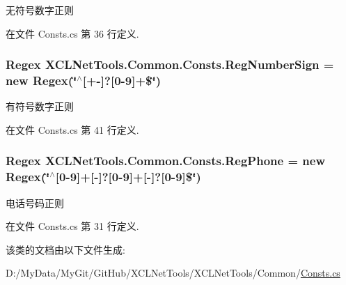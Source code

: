无符号数字正则 



在文件 Consts.\-cs 第 36 行定义.

\hypertarget{class_x_c_l_net_tools_1_1_common_1_1_consts_aaa6eaa871d664473d2e6d189c825f177}{
\subsubsection[{Reg\-Number\-Sign}]{\setlength{\rightskip}{0pt plus 5cm}Regex X\-C\-L\-Net\-Tools.\-Common.\-Consts.\-Reg\-Number\-Sign = new Regex(\char`\"{}$^\wedge$\mbox{[}+-\/\mbox{]}?\mbox{[}0-\/9\mbox{]}+\$\char`\"{})\hspace{0.3cm}{\ttfamily [static]}}}\label{class_x_c_l_net_tools_1_1_common_1_1_consts_aaa6eaa871d664473d2e6d189c825f177}


有符号数字正则 



在文件 Consts.\-cs 第 41 行定义.

\hypertarget{class_x_c_l_net_tools_1_1_common_1_1_consts_a88185aad823255cb7bf15a88d8ef55de}{
\subsubsection[{Reg\-Phone}]{\setlength{\rightskip}{0pt plus 5cm}Regex X\-C\-L\-Net\-Tools.\-Common.\-Consts.\-Reg\-Phone = new Regex(\char`\"{}$^\wedge$\mbox{[}0-\/9\mbox{]}+\mbox{[}-\/\mbox{]}?\mbox{[}0-\/9\mbox{]}+\mbox{[}-\/\mbox{]}?\mbox{[}0-\/9\mbox{]}\$\char`\"{})\hspace{0.3cm}{\ttfamily [static]}}}\label{class_x_c_l_net_tools_1_1_common_1_1_consts_a88185aad823255cb7bf15a88d8ef55de}


电话号码正则 



在文件 Consts.\-cs 第 31 行定义.



该类的文档由以下文件生成\-:\begin{DoxyCompactItemize}
\item 
D\-:/\-My\-Data/\-My\-Git/\-Git\-Hub/\-X\-C\-L\-Net\-Tools/\-X\-C\-L\-Net\-Tools/\-Common/\hyperlink{_consts_8cs}{Consts.\-cs}\end{DoxyCompactItemize}
